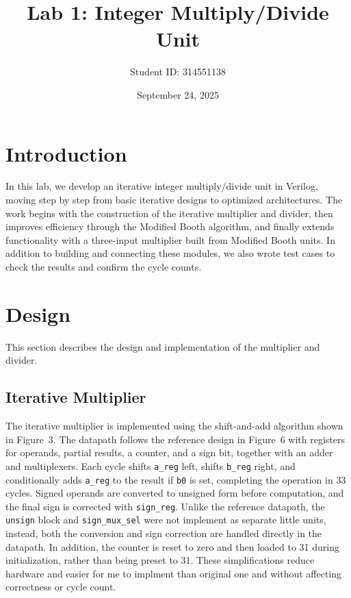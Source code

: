 \documentclass[11pt,a4paper]{article}
\begin{document}
\title{Lab 1: Integer Multiply/Divide Unit}
\author{Student ID: 314551138}
\date{September 24, 2025}
\maketitle

\section{Introduction}
In this lab, we develop an iterative integer multiply/divide unit in Verilog, moving step by step from basic iterative designs to optimized architectures. The work begins with the construction of the iterative multiplier and divider, then improves efficiency through the Modified Booth algorithm, and finally extends functionality with a three-input multiplier built from Modified Booth units.
In addition to building and connecting these modules, we also wrote test cases to check the results and confirm the cycle counts.
\section{Design}
This section describes the design and implementation of the multiplier and divider.

\subsection{Iterative Multiplier}
The iterative multiplier is implemented using the shift-and-add algorithm shown in Figure~3. 
The datapath follows the reference design in Figure~6 with registers for operands, partial 
results, a counter, and a sign bit, together with an adder and multiplexers. Each cycle 
shifts \texttt{a\_reg} left, shifts \texttt{b\_reg} right, and conditionally adds \texttt{a\_reg} 
to the result if \texttt{b0} is set, completing the operation in 33 cycles. Signed operands 
are converted to unsigned form before computation, and the final sign is corrected with 
\texttt{sign\_reg}. Unlike the reference datapath, the \texttt{unsign} block and 
\texttt{sign\_mux\_sel} were not implement as separate little units, instead, both the conversion 
and sign correction are handled directly in the datapath. In addition, the counter is reset 
to zero and then loaded to 31 during initialization, rather than being preset to 31. These 
simplifications reduce hardware and easier for me to implment than original one  and without affecting correctness or cycle count.
\end{document}
